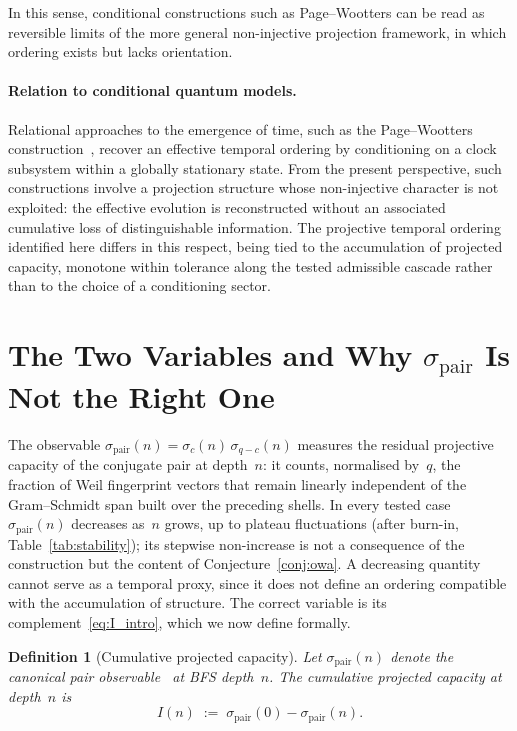 \documentclass[11pt,a4paper]{article}
\newtheorem{definition}{Definition}
\begin{document}
  In this sense, conditional constructions such as Page--Wootters can be
  read as reversible limits of the more general non-injective projection
  framework, in which ordering exists but lacks orientation.

  \paragraph{Relation to conditional quantum models.}
    Relational approaches to the emergence of time, such as the Page--Wootters
    construction~\cite{PageWootters1983}, recover an effective temporal ordering by
    conditioning on a clock subsystem within a globally stationary state.
    From the present perspective, such constructions involve a projection structure
    whose non-injective character is not exploited: the effective evolution is
    reconstructed without an associated cumulative loss of distinguishable information.
    The projective temporal ordering identified here differs in this respect,
    being tied to the accumulation of projected capacity, monotone within tolerance along the tested admissible
    cascade rather than to the choice of a conditioning sector.

  \section{The Two Variables and Why $\sigma_{\mathrm{pair}}$ Is Not the Right One}

  The observable $\sigma_{\mathrm{pair}}(n) = \sigma_c(n)\,\sigma_{q-c}(n)$
  measures the residual projective capacity of the conjugate pair at
  depth~$n$: it counts, normalised by~$q$, the fraction of Weil
  fingerprint vectors that remain linearly independent of the
  Gram--Schmidt span built over the preceding shells.
  In every tested case $\sigma_{\mathrm{pair}}(n)$ decreases as~$n$ grows, up to plateau fluctuations
  (after burn-in, Table~\ref{tab:stability}); its stepwise non-increase is not
  a consequence of the construction but the content of
  Conjecture~\ref{conj:owa}.
  A decreasing quantity cannot serve as a temporal proxy, since it does not
  define an ordering compatible with the accumulation of structure.
  The correct variable is its complement~\eqref{eq:I_intro}, which we
  now define formally.

  \begin{definition}[Cumulative projected capacity]
Let $\sigma_{\mathrm{pair}}(n)$ denote the canonical pair
observable~\cite{Beau2026a29} at BFS depth~$n$.
The \emph{cumulative projected capacity} at depth~$n$ is
\begin{equation}
  \label{eq:I}
  I(n) \;:=\; \sigma_{\mathrm{pair}}(0) - \sigma_{\mathrm{pair}}(n).
\end{equation}
  \end{definition}
\end{document}
